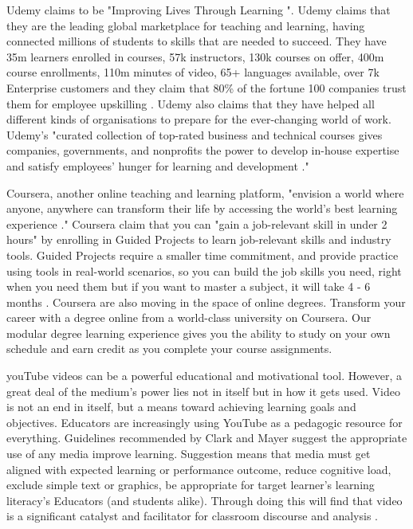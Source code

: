 		Udemy claims to be "Improving Lives Through Learning \cite{udemy}". Udemy claims that they are the leading global marketplace for teaching and learning, having connected millions of students to skills that are needed to succeed. They have 35m learners enrolled in courses, 57k instructors, 130k courses on offer, 400m course enrollments, 110m minutes of video, 65+ languages available, over 7k Enterprise customers and they claim that 80\% of the fortune 100 companies trust them for employee upskilling \cite{udemy}. Udemy also claims that they have helped all different kinds of organisations to prepare for the ever-changing world of work. Udemy's "curated collection of top-rated business and technical courses gives companies, governments, and nonprofits the power to develop in-house expertise and satisfy employees' hunger for learning and development \cite{udemy}." 
		
		Coursera, another online teaching and learning platform, "envision a world where anyone, anywhere can transform their life by accessing the world's best learning experience \cite{coursera}." Coursera claim that you can "gain a job-relevant skill in under 2 hours" by enrolling in Guided Projects to learn job-relevant skills and industry tools. Guided Projects require a smaller time commitment, and provide practice using tools in real-world scenarios, so you can build the job skills you need, right when you need them but if you want to master a subject, it will take 4 - 6 months \cite{coursera}. Coursera are also moving in the space of online degrees. Transform your career with a degree online from a world-class university on Coursera. Our modular degree learning experience gives you the ability to study on your own schedule and earn credit as you complete your course assignments. 
		
		youTube videos can be a powerful educational and motivational tool. However, a great deal of the medium's power lies not in itself but in how it gets used. Video is not an end in itself, but a means toward achieving learning goals and objectives. Educators are increasingly using YouTube as a pedagogic resource for everything. Guidelines recommended by Clark and Mayer \cite{clark2016learning} suggest the appropriate use of any media improve learning. Suggestion means that media must get aligned with expected learning or performance outcome, reduce cognitive load, exclude simple text or graphics, be appropriate for target learner's learning literacy's Educators (and students alike). Through doing this will find that video is a significant catalyst and facilitator for classroom discourse and analysis \cite{duffy2008engaging}.
		
